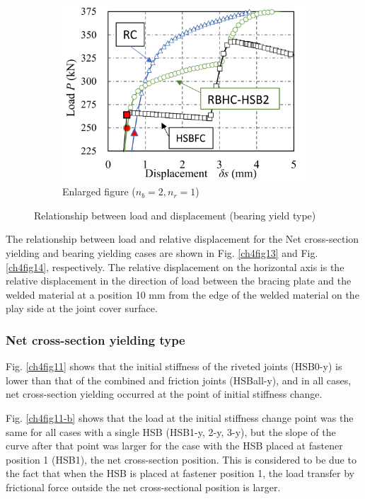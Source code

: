 \begin{figure}[htbp]
\begin{subfigure}[t]{0.48\textwidth}
    \label{ch4fig12-b}
    \end{subfigure}
    \hfill
    \begin{subfigure}[t]{0.48\textwidth}
    \includegraphics[width=\linewidth]{imgs/ch4/fig12-c.pdf}
    \caption{Enlarged figure ($n_b=2, n_r=1$)}
    \label{ch4fig12-c}
    \end{subfigure}
    \caption{Relationship between load and displacement (bearing yield type)}
    \label{ch4fig12}
\end{figure}

The relationship between load and relative displacement for the Net cross-section yielding and bearing yielding cases are shown in Fig. \ref{ch4fig13} and Fig. \ref{ch4fig14}, respectively. The relative displacement on the horizontal axis is the relative displacement in the direction of load between the bracing plate and the welded material at a position 10 mm from the edge of the welded material on the play side at the joint cover surface.

\subsubsection{Net cross-section yielding type}

Fig. \ref{ch4fig11} shows that the initial stiffness of the riveted joints (HSB0-y) is lower than that of the combined and friction joints (HSBall-y), and in all cases, net cross-section yielding occurred at the point of initial stiffness change.

Fig. \ref{ch4fig11-b} shows that the load at the initial stiffness change point was the same for all cases with a single \ac{HSB} (HSB1-y, 2-y, 3-y), but the slope of the curve after that point was larger for the case with the \ac{HSB} placed at fastener position 1 (HSB1), the net cross-section position. This is considered to be due to the fact that when the \ac{HSB} is placed at fastener position 1, the load transfer by frictional force outside the net cross-sectional position is larger.

